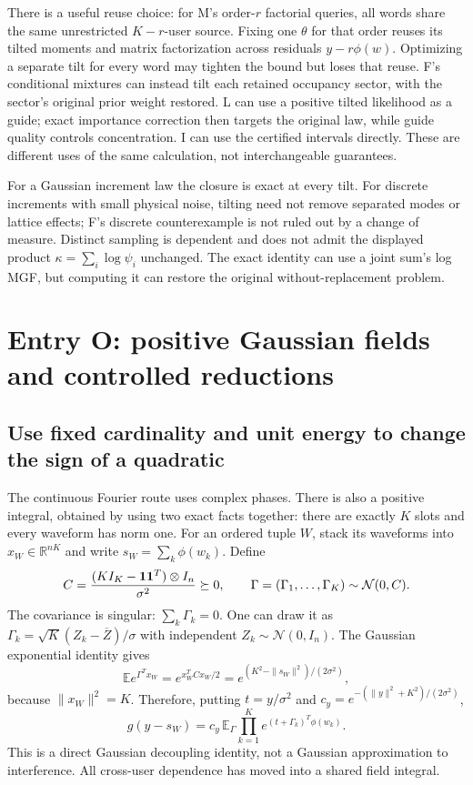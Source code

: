 \documentclass[10pt,a4paper]{article}
\newcommand{\E}{\mathbb E}
\begin{document}
There is a useful reuse choice: for M's order-$r$ factorial queries, all words share the same unrestricted
$K-r$-user source. Fixing one $\theta$ for that order reuses its tilted moments and matrix factorization
across residuals $y-r\phi(w)$. Optimizing a separate tilt for every word may tighten the bound but loses that
reuse. F's conditional mixtures can instead tilt each retained occupancy sector, with the sector's original
prior weight restored. L can use a positive tilted likelihood as a guide; exact importance correction then
targets the original law, while guide quality controls concentration. I can use the certified intervals
directly. These are different uses of the same calculation, not interchangeable guarantees.

For a Gaussian increment law the closure is exact at every tilt. For discrete increments with small physical
noise, tilting need not remove separated modes or lattice effects; F's discrete counterexample is not ruled
out by a change of measure. Distinct sampling is dependent and does not admit the displayed product
$\kappa=\sum_i\log\psi_i$ unchanged. The exact identity can use a joint sum's log MGF, but computing it can
restore the original without-replacement problem.

\clearpage
\section{Entry O: positive Gaussian fields and controlled reductions}
\label{sec:positive-gaussian-field}
\subsection{Use fixed cardinality and unit energy to change the sign of a quadratic}
The continuous Fourier route uses complex phases. There is also a positive integral, obtained by using
two exact facts together: there are exactly $K$ slots and every waveform has norm one.
For an ordered tuple $W$, stack its waveforms into $x_W\in\mathbb R^{nK}$ and write $s_W=\sum_k\phi(w_k)$.
Define
\[
 C=\frac{(KI_K-\mathbf{1}\mathbf{1}^T)\otimes I_n}{\sigma^2}\succeq0,\qquad
 \Gamma=(\Gamma_1,\ldots,\Gamma_K)\sim\mathcal N(0,C).
\]
The covariance is singular: $\sum_k\Gamma_k=0$. One can draw it as
$\Gamma_k=\sqrt K(Z_k-\overline Z)/\sigma$ with independent $Z_k\sim\mathcal N(0,I_n)$.
The Gaussian exponential identity gives
\[
 \E e^{\Gamma^Tx_W}
 =e^{x_W^TCx_W/2}
 =e^{(K^2-\|s_W\|^2)/(2\sigma^2)},
\]
because $\|x_W\|^2=K$. Therefore, putting $t=y/\sigma^2$ and
$c_y=e^{-(\|y\|^2+K^2)/(2\sigma^2)}$,
\begin{equation}
 g(y-s_W)=c_y\,\E_\Gamma\prod_{k=1}^K
       e^{(t+\Gamma_k)^T\phi(w_k)}.
 \label{eq:positive-field-identity}
\end{equation}
This is a direct Gaussian decoupling identity, not a Gaussian approximation to interference.
All cross-user dependence has moved into a shared field integral.
\end{document}
